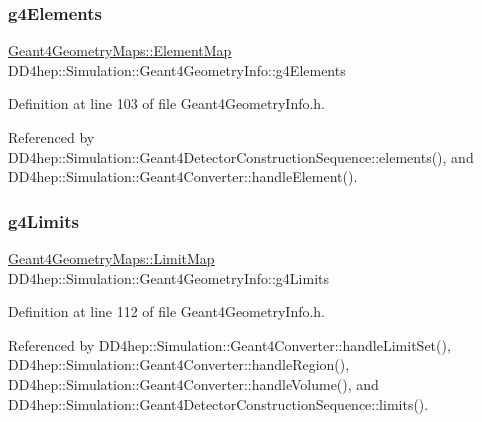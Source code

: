 \subsubsection{\texorpdfstring{g4\+Elements}{g4Elements}}
{\footnotesize\ttfamily \hyperlink{namespace_d_d4hep_1_1_simulation_1_1_geant4_geometry_maps_a175b532b796e7de3d9128c1f0e1ee406}{Geant4\+Geometry\+Maps\+::\+Element\+Map} D\+D4hep\+::\+Simulation\+::\+Geant4\+Geometry\+Info\+::g4\+Elements}



Definition at line 103 of file Geant4\+Geometry\+Info.\+h.



Referenced by D\+D4hep\+::\+Simulation\+::\+Geant4\+Detector\+Construction\+Sequence\+::elements(), and D\+D4hep\+::\+Simulation\+::\+Geant4\+Converter\+::handle\+Element().

\hypertarget{class_d_d4hep_1_1_simulation_1_1_geant4_geometry_info_a6005f56c4ca13d015288ae645e58df69}{}\label{class_d_d4hep_1_1_simulation_1_1_geant4_geometry_info_a6005f56c4ca13d015288ae645e58df69} 
\subsubsection{\texorpdfstring{g4\+Limits}{g4Limits}}
{\footnotesize\ttfamily \hyperlink{namespace_d_d4hep_1_1_simulation_1_1_geant4_geometry_maps_a338013d6709b82358b8e2490cdba0ed2}{Geant4\+Geometry\+Maps\+::\+Limit\+Map} D\+D4hep\+::\+Simulation\+::\+Geant4\+Geometry\+Info\+::g4\+Limits}



Definition at line 112 of file Geant4\+Geometry\+Info.\+h.



Referenced by D\+D4hep\+::\+Simulation\+::\+Geant4\+Converter\+::handle\+Limit\+Set(), D\+D4hep\+::\+Simulation\+::\+Geant4\+Converter\+::handle\+Region(), D\+D4hep\+::\+Simulation\+::\+Geant4\+Converter\+::handle\+Volume(), and D\+D4hep\+::\+Simulation\+::\+Geant4\+Detector\+Construction\+Sequence\+::limits().

\hypertarget{class_d_d4hep_1_1_simulation_1_1_geant4_geometry_info_a371057dc8aa3117cc3dfc465fd692cfb}{}\label{class_d_d4hep_1_1_simulation_1_1_geant4_geometry_info_a371057dc8aa3117cc3dfc465fd692cfb} 
